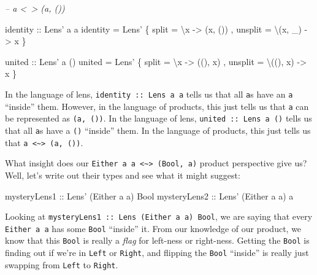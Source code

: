 \documentclass[]{article}
\newenvironment{Shaded}{}{}
\newcommand{\CommentTok}[1]{\textcolor[rgb]{0.38,0.63,0.69}{\textit{#1}}}
\newcommand{\DataTypeTok}[1]{\textcolor[rgb]{0.56,0.13,0.00}{#1}}
\newcommand{\FunctionTok}[1]{\textcolor[rgb]{0.02,0.16,0.49}{#1}}
\newcommand{\NormalTok}[1]{#1}
\newcommand{\OtherTok}[1]{\textcolor[rgb]{0.00,0.44,0.13}{#1}}
\begin{document}
\begin{Shaded}
\begin{Highlighting}[]
\CommentTok{-- a <~> (a, ())}

\OtherTok{identity ::} \DataTypeTok{Lens'}\NormalTok{ a a}
\NormalTok{identity }\FunctionTok{=} \DataTypeTok{Lens'}\NormalTok{ \{ split   }\FunctionTok{=}\NormalTok{ \textbackslash{}x      }\OtherTok{->}\NormalTok{ (x, ())}
\NormalTok{                 , unsplit }\FunctionTok{=}\NormalTok{ \textbackslash{}(x, _) }\OtherTok{->}\NormalTok{ x}
\NormalTok{                 \}}

\OtherTok{united ::} \DataTypeTok{Lens'}\NormalTok{ a ()}
\NormalTok{united }\FunctionTok{=} \DataTypeTok{Lens'}\NormalTok{ \{ split   }\FunctionTok{=}\NormalTok{ \textbackslash{}x       }\OtherTok{->}\NormalTok{ ((), x)}
\NormalTok{               , unsplit }\FunctionTok{=}\NormalTok{ \textbackslash{}((), x) }\OtherTok{->}\NormalTok{ x}
\NormalTok{               \}}
\end{Highlighting}
\end{Shaded}

In the language of lens, \texttt{identity\ ::\ Lens\textquotesingle{}\ a\ a}
tells us that all \texttt{a}s have an \texttt{a} ``inside'' them. However, in
the language of products, this just tells us that \texttt{a} can be represented
as \texttt{(a,\ ())}. In the language of lens,
\texttt{united\ ::\ Lens\textquotesingle{}\ a\ ()} tells us that all \texttt{a}s
have a \texttt{()} ``inside'' them. In the language of products, this just tells
us that \texttt{a\ \textless{}\textasciitilde{}\textgreater{}\ (a,\ ())}.

What insight does our
\texttt{Either\ a\ a\ \textless{}\textasciitilde{}\textgreater{}\ (Bool,\ a)}
product perspective give us? Well, let's write out their types and see what it
might suggest:

\begin{Shaded}
\begin{Highlighting}[]
\OtherTok{mysteryLens1 ::} \DataTypeTok{Lens'}\NormalTok{ (}\DataTypeTok{Either}\NormalTok{ a a) }\DataTypeTok{Bool}
\OtherTok{mysteryLens2 ::} \DataTypeTok{Lens'}\NormalTok{ (}\DataTypeTok{Either}\NormalTok{ a a) a}
\end{Highlighting}
\end{Shaded}

Looking at
\texttt{mysteryLens1\ ::\ Lens\textquotesingle{}\ (Either\ a\ a)\ Bool}, we are
saying that every \texttt{Either\ a\ a} has some \texttt{Bool} ``inside'' it.
From our knowledge of our product, we know that this \texttt{Bool} is really a
\emph{flag} for left-ness or right-ness. Getting the \texttt{Bool} is finding
out if we're in \texttt{Left} or \texttt{Right}, and flipping the \texttt{Bool}
``inside'' is really just swapping from \texttt{Left} to \texttt{Right}.
\end{document}
